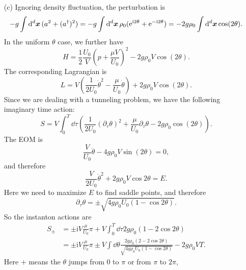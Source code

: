 \documentclass[hyperref, a4paper]{article}
\newcommand*{\ii}{\mathrm{i}}
\newcommand*{\ee}{\mathrm{e}}
\begin{document}
\begin{itemize}
\item[(c)] Ignoring density fluctuation,
the perturbation is 
\begin{equation}
    - g \int \dd[d]{\vb*{x}} (a^2 + (a^\dagger)^2) = 
    - g \int \dd[d]{\vb*{x}} \rho_0 (\ee^{\ii 2 \theta} + \ee^{- \ii 2 \theta})
    = - 2 g \rho_0 \int \dd[d]{\vb*{x}} \cos(2 \theta).
\end{equation}
In the uniform $\theta$ case, we further have 
\begin{equation}
    H = \frac{1}{2} \frac{U_0}{V} \left( p + \frac{\mu V}{U_0} \right)^2
    - 2 g \rho_0 V \cos(2 \theta).
\end{equation}
The corresponding Lagrangian is 
\begin{equation}
    L=V\left(\frac{1}{2 U_0} \dot{\theta}^2-\frac{\mu}{U_0} \dot{\theta}\right)
    + 2 g \rho_0 V \cos(2 \theta).
\end{equation}
Since we are dealing with a tunneling problem, we have the following imaginary time action:
\begin{equation}
    S = V \int_0^{T} \dd{\tau}
    \left( 
        \frac{1}{2U_0} (\partial_\tau \theta)^2 
        + \frac{\mu}{U_0} \partial_\tau \theta 
        - 2 g \rho_0 \cos(2\theta) \right) .
\end{equation}
The EOM is 
\begin{equation}
    \frac{V}{U_0} \ddot{\theta} - 4 g \rho_0 V \sin(2\theta) = 0,
\end{equation}
and therefore 
\begin{equation}
    \frac{V}{2U_0} \dot{\theta}^2 + 2g \rho_0 V \cos 2 \theta = E.
\end{equation}
Here we need to maximize $E$ to find saddle points,
and therefore 
\begin{equation}
    \partial_\tau \theta = \pm \sqrt{ 4 g \rho_0 U_0 (1 - \cos 2 \theta) }.
\end{equation}
So the instanton actions are 
\begin{equation}
    \begin{aligned}
        S_\pm &= \pm \ii V \frac{\mu}{U_0} \pi + V \int_0^T \dd{\tau} 2 g \rho_0 (1 - 2 \cos 2\theta)  \\
        &= \pm \ii V \frac{\mu}{U_0} \pi 
        \pm V \int \dd{\theta} 
        \frac{2 g \rho_0 (2 - 2 \cos 2\theta)}{\sqrt{ 4 g \rho_0 U_0 (1 - \cos 2 \theta) }} 
        - 2 g \rho_0 V T .
    \end{aligned}
\end{equation}
Here $+$ means the $\theta$ jumps from $0$ to $\pi$ or from $\pi$ to $2\pi$,

\end{itemize}
\end{document}
